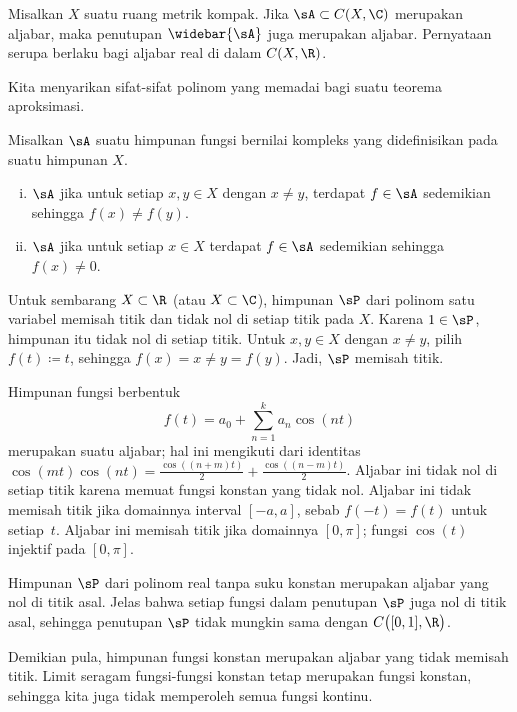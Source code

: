 \begin{prop} \label{prop:closureofalgebra}
Misalkan $X$ suatu ruang metrik kompak. Jika $\sA \subset C(X,\C)$ merupakan
aljabar, maka penutupan $\widebar{\sA}$ juga merupakan aljabar. Pernyataan
serupa berlaku bagi aljabar real di dalam $C(X,\R)$.
\end{prop}

Kita menyarikan sifat-sifat polinom yang memadai bagi suatu teorema
aproksimasi.

\begin{defn}
Misalkan $\sA$ suatu himpunan fungsi bernilai kompleks yang didefinisikan pada
suatu himpunan $X$.
\begin{enumerate}[(i)]
\item $\sA$ \emph{} jika untuk setiap $x,y \in X$
dengan $x \neq y$, terdapat $f \in \sA$ sedemikian sehingga
$f(x) \neq f(y)$.
\item 
$\sA$ \emph{} jika untuk setiap $x \in X$
terdapat $f \in \sA$ sedemikian sehingga $f(x) \neq 0$.
\end{enumerate}
\end{defn}

\begin{example}
Untuk sembarang $X \subset \R$ (atau $X \subset \C$), himpunan $\sP$ dari
polinom satu variabel memisah titik dan tidak nol di setiap titik pada $X$.
Karena $1 \in \sP$, himpunan itu tidak nol di setiap titik. Untuk
$x,y \in X$ dengan $x \neq y$, pilih $f(t) \coloneqq t$, sehingga
$f(x) = x \neq y = f(y)$. Jadi, $\sP$ memisah titik.
\end{example}

\begin{example}
Himpunan fungsi berbentuk
\begin{equation*}
f(t) = a_0 + \sum_{n=1}^k a_n \cos(nt)
\end{equation*}
merupakan suatu aljabar; hal ini mengikuti dari identitas
$\cos(mt)\cos(nt) = 
\frac{\cos((n+m) t)}{2}+
\frac{\cos((n-m) t)}{2}$.
Aljabar ini tidak nol di setiap titik karena memuat fungsi konstan yang tidak
nol. Aljabar ini tidak memisah titik jika domainnya interval $[-a,a]$, sebab
$f(-t) = f(t)$ untuk setiap~$t$. Aljabar ini memisah titik jika domainnya
$[0,\pi]$; fungsi $\cos(t)$ injektif pada $[0,\pi]$.
\end{example}

\begin{example}
Himpunan $\sP$ dari polinom real tanpa suku konstan merupakan aljabar yang nol
di titik asal. Jelas bahwa setiap fungsi dalam penutupan $\sP$ juga nol di
titik asal, sehingga penutupan $\sP$ tidak mungkin sama dengan
$C\bigl([0,1],\R\bigr)$.

Demikian pula, himpunan fungsi konstan merupakan aljabar yang tidak memisah
titik. Limit seragam fungsi-fungsi konstan tetap merupakan fungsi konstan,
sehingga kita juga tidak memperoleh semua fungsi kontinu.
\end{example}


